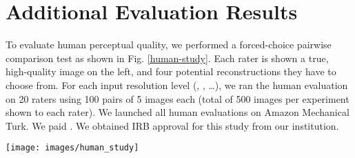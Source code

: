 \documentclass{article}
\newcommand{\w}{2.5cm}
\begin{document}
\FloatBarrier

\section{Additional Evaluation Results}
\label{supp-eval-humans}


To evaluate human perceptual quality, we performed a forced-choice pairwise comparison test as shown in Fig. \ref{human-study}. Each rater is shown a true, high-quality image on the left, and four potential reconstructions they have to choose from.  For each input resolution level (, , \dots), we ran the human evaluation on 20 raters using 100 pairs of 5 images each (total of 500 images per experiment shown to each rater). We launched all human evaluations on Amazon Mechanical Turk. We paid \9. We obtained IRB approval for this study from our institution.


\begin{figure*}
\begin{center}
\texttt{[image: images/human\_study]}
\caption{Setup of our human study, using a forced-choice pairwise comparison design. Each rater is shown a true, high-quality image on the left, and four potential reconstructions (A-D) by different algorithms. They have to select which reconstruction best resembled the HQ image. }
\label{human-study}
\end{center}
\end{figure*}







\renewcommand{\w}{1.8cm}



\renewcommand{\is}{52116}
\renewcommand{\step}{step700}
\end{document}

